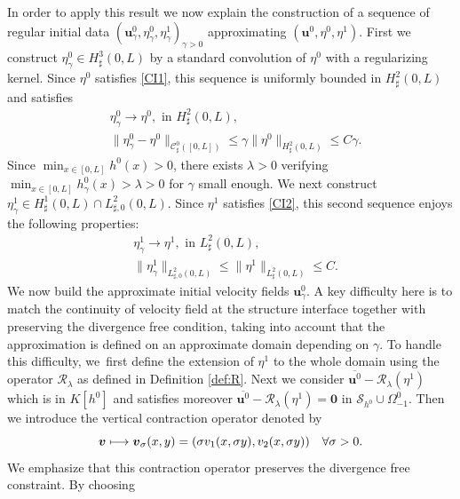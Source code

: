 \documentclass[JEP,XML,SOM,Unicode,NoFloatCountersInSection]{cedram}
\let\mathcal\mathscr
\newcommand\mto{\mathchoice{\longmapsto}{\mapsto}{\mapsto}{\mapsto}}
\theoremstyle{remark}
\theoremstyle{definition}
\newcommand{\ug}{\boldsymbol{u}}
\newcommand{\vg}{\boldsymbol{v}}
\newcommand{\BS}[1]{\boldsymbol{#1}}
\begin{document}
In order to apply this result we now explain the construction of a sequence of regular initial data $(\ug_\gamma^0,\eta_\gamma^0, \eta_\gamma^1)_{\gamma >0}$ approximating $(\ug^0, \eta^0, \eta^1)$. First we construct \hbox{$\eta^0_\gamma\in H^{3}_{\sharp}(0,L)$} by a standard convolution of $\eta^0$ with a regularizing kernel. Since $\eta^0$ satisfies \eqref{CI1}, this sequence is uniformly bounded in $H^2_\sharp(0,L)$ and satisfies
\begin{align*}
& \eta^0_\gamma\to \eta^0, \text{ in }H^2_\sharp(0,L),\\
& \| \eta^0_\gamma- \eta^0\|_{\mathcal{C}_\sharp^0([0, L])}\leq \gamma \|\eta^0\|_{H^2_\sharp(0, L)}\leq C\gamma.
\end{align*}
Since $\min_{x\in[0, L]}h^0(x)>0$, there exists $\lambda>0$ verifying $\min_{x\in[0, L]}h_\gamma^0(x)>\lambda >0$ for $\gamma$ small enough.
We next construct $\eta^1_\gamma \in H^{1}_{\sharp}(0,L)\cap L^2_{\sharp, 0}(0, L)$.
Since $\eta^1$ satisfies \eqref{CI2}, this second sequence enjoys the following properties:
\begin{align*}
& \eta^1_\gamma\to \eta^1, \text{ in }L^2_\sharp(0,L),\\
& \| \eta^1_\gamma \|_{{L}^2_{\sharp,0}(0, L)}\leq \|\eta^1\|_{L^2_\sharp(0, L)}\leq C.
\end{align*}
We now build the approximate initial velocity fields $\ug^0_{\gamma}$.
A key difficulty here is to match the continuity of velocity field at the structure interface together with preserving the divergence free condition, taking into account
that the approximation is defined on an approximate domain depending on $\gamma$.
To handle this difficulty, we~first define the extension of $\eta^1$ to the whole domain using the operator $\mathcal R_{\lambda}$
as defined in Definition \ref{def:R}. Next we consider $\overline{\ug^0}-\mathcal{R}_\lambda(\eta^1)$ which is in $K[h^0]$ and satisfies moreover $\overline{\ug^{0}}-\mathcal{R}_\lambda(\eta^1)= \BS{0}$ in $\mathcal{S}_{h^0}\cup \Omega_{-1}^0$. Then we introduce the vertical contraction operator denoted by
\[
\vg \mto \vg_\sigma(x, y)=(\sigma v_1(x, \sigma y), v_2(x, \sigma y)) \quad \forall \sigma >0.
\]
We emphasize that this contraction operator preserves the divergence free constraint. By choosing
\end{document}

